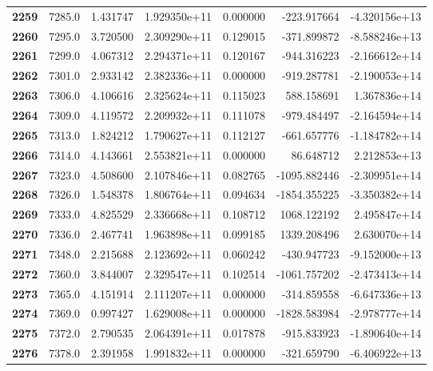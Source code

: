 \documentclass{report}[12pt]
\begin{document}
\begin{center}
\begin{tabular}{lrrrrrr}
\textbf{2259} &         7285.0 &   1.431747 &  1.929350e+11 &    0.000000 &  -223.917664 & -4.320156e+13 \\
\textbf{2260} &         7295.0 &   3.720500 &  2.309290e+11 &    0.129015 &  -371.899872 & -8.588246e+13 \\
\textbf{2261} &         7299.0 &   4.067312 &  2.294371e+11 &    0.120167 &  -944.316223 & -2.166612e+14 \\
\textbf{2262} &         7301.0 &   2.933142 &  2.382336e+11 &    0.000000 &  -919.287781 & -2.190053e+14 \\
\textbf{2263} &         7306.0 &   4.106616 &  2.325624e+11 &    0.115023 &   588.158691 &  1.367836e+14 \\
\textbf{2264} &         7309.0 &   4.119572 &  2.209932e+11 &    0.111078 &  -979.484497 & -2.164594e+14 \\
\textbf{2265} &         7313.0 &   1.824212 &  1.790627e+11 &    0.112127 &  -661.657776 & -1.184782e+14 \\
\textbf{2266} &         7314.0 &   4.143661 &  2.553821e+11 &    0.000000 &    86.648712 &  2.212853e+13 \\
\textbf{2267} &         7323.0 &   4.508600 &  2.107846e+11 &    0.082765 & -1095.882446 & -2.309951e+14 \\
\textbf{2268} &         7326.0 &   1.548378 &  1.806764e+11 &    0.094634 & -1854.355225 & -3.350382e+14 \\
\textbf{2269} &         7333.0 &   4.825529 &  2.336668e+11 &    0.108712 &  1068.122192 &  2.495847e+14 \\
\textbf{2270} &         7336.0 &   2.467741 &  1.963898e+11 &    0.099185 &  1339.208496 &  2.630070e+14 \\
\textbf{2271} &         7348.0 &   2.215688 &  2.123692e+11 &    0.060242 &  -430.947723 & -9.152000e+13 \\
\textbf{2272} &         7360.0 &   3.844007 &  2.329547e+11 &    0.102514 & -1061.757202 & -2.473413e+14 \\
\textbf{2273} &         7365.0 &   4.151914 &  2.111207e+11 &    0.000000 &  -314.859558 & -6.647336e+13 \\
\textbf{2274} &         7369.0 &   0.997427 &  1.629008e+11 &    0.000000 & -1828.583984 & -2.978777e+14 \\
\textbf{2275} &         7372.0 &   2.790535 &  2.064391e+11 &    0.017878 &  -915.833923 & -1.890640e+14 \\
\textbf{2276} &         7378.0 &   2.391958 &  1.991832e+11 &    0.000000 &  -321.659790 & -6.406922e+13 \\

\end{tabular}
\end{center}
\end{document}
